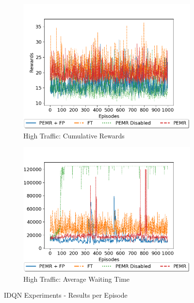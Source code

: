\documentclass{llncs}
\begin{document}
\begin{figure}[ht!]
\begin{subfigure}[b]{0.48\textwidth}
        \includegraphics[width=\textwidth]{images/High-Load-REW.png}
  		\caption{High Traffic: Cumulative Rewards}
  		\label{fig:HighIDQNREW}
    \end{subfigure}
    \begin{subfigure}[b]{0.48\textwidth}
        \includegraphics[width=\textwidth]{images/High-Load-AWT.png}
  		\caption{High Traffic: Average Waiting Time}
  		\label{fig:HighIDQNAWT}
    \end{subfigure}
    \caption{IDQN Experiments - Results per Episode}\label{fig:LowHighIDQNExp}
\end{figure}

\end{document}
